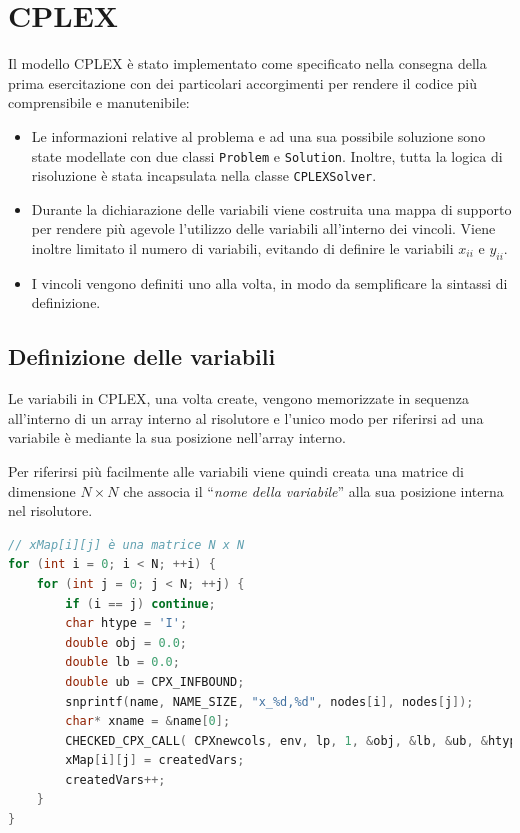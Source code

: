 
\section{CPLEX} \label{sec:cplex}

Il modello CPLEX è stato implementato come specificato nella consegna della prima esercitazione con dei particolari accorgimenti per rendere il codice più comprensibile e manutenibile:

\begin{itemize}
	\item Le informazioni relative al problema e ad una sua possibile soluzione sono state modellate con due classi \texttt{Problem} e \texttt{Solution}. Inoltre, tutta la logica di risoluzione è stata incapsulata nella classe \texttt{CPLEXSolver}.
	\item Durante la dichiarazione delle variabili viene costruita una mappa di supporto per rendere più agevole l'utilizzo delle variabili all'interno dei vincoli. Viene inoltre limitato il numero di variabili, evitando di definire le variabili $x_{ii}$ e $y_{ii}$.
	\item I vincoli vengono definiti uno alla volta, in modo da semplificare la sintassi di definizione.
\end{itemize}

\subsection{Definizione delle variabili}

Le variabili in CPLEX, una volta create, vengono memorizzate in sequenza all'interno di un array interno al risolutore e l'unico modo per riferirsi ad una variabile è mediante la sua posizione nell'array interno.

Per riferirsi più facilmente alle variabili viene quindi creata una matrice di dimensione $N\times N$ che associa il ``\textit{nome della variabile}'' alla sua posizione interna nel risolutore.

\begin{lstlisting}[language=C++, caption=Creazione delle variabili $x_{ij}$]
// xMap[i][j] è una matrice N x N
for (int i = 0; i < N; ++i) {
	for (int j = 0; j < N; ++j) {
		if (i == j) continue;
		char htype = 'I';
		double obj = 0.0;
		double lb = 0.0;
		double ub = CPX_INFBOUND;
		snprintf(name, NAME_SIZE, "x_%d,%d", nodes[i], nodes[j]);
		char* xname = &name[0];
		CHECKED_CPX_CALL( CPXnewcols, env, lp, 1, &obj, &lb, &ub, &htype, &xname );
		xMap[i][j] = createdVars;
		createdVars++;
	}
}
\end{lstlisting}

